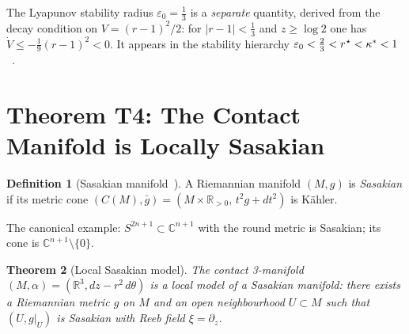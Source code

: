 \documentclass[12pt,a4paper]{article}
\theoremstyle{plain}
\newtheorem{theorem}{Theorem}[section]
\theoremstyle{definition}
\newtheorem{definition}[theorem]{Definition}
\theoremstyle{remark}
\newcommand{\rstar}{r^{\kern0.5pt\star}}
\begin{document}
\medskip
The Lyapunov stability radius $\varepsilon_0=\tfrac{1}{3}$ is a \emph{separate} quantity,
derived from the decay condition on $V=(r-1)^2/2$: for $|r-1|<\tfrac{1}{3}$
and $z\geq\log 2$ one has $\dot V\leq -\tfrac{1}{9}(r-1)^2<0$.
It appears in the stability hierarchy
$\varepsilon_0 < \tfrac{2}{3} < \rstar < \kappa^* < 1$~\cite{Grossi2026togt}.

\section{Theorem T4: The Contact Manifold is Locally Sasakian}
\label{sec:T4}

\begin{definition}[Sasakian manifold~\cite{Sparks2011}]
A Riemannian manifold $(M,g)$ is \emph{Sasakian} if its metric cone
$(C(M),\bar g)=(M\times\mathbb{R}_{>0},\,t^2 g+dt^2)$ is Kähler.
\end{definition}

The canonical example: $S^{2n+1}\subset\mathbb{C}^{n+1}$ with the round metric is
Sasakian; its cone is $\mathbb{C}^{n+1}\setminus\{0\}$.

\begin{theorem}[Local Sasakian model]\label{thm:sasakian}
The contact 3-manifold $(M,\alpha)=(\mathbb{R}^3,dz-r^2\,d\theta)$ is a local
model of a Sasakian manifold: there exists a Riemannian metric $g$ on $M$ and an
open neighbourhood $U\subset M$ such that $(U,g|_U)$ is Sasakian with Reeb field $\xi=\partial_z$.
\end{theorem}
\end{document}
